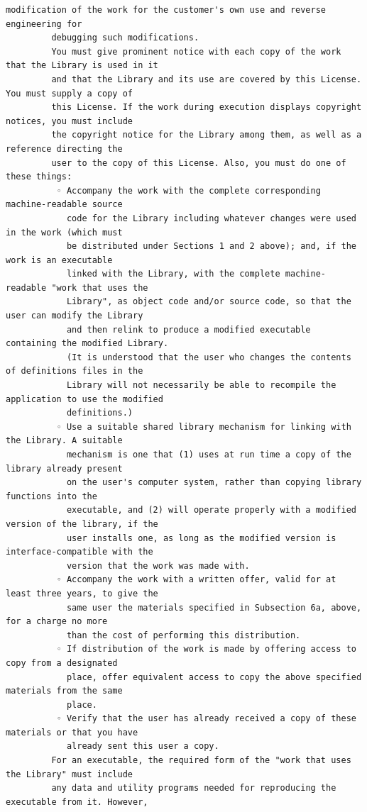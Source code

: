\begin{lstlisting}[basicstyle=\ttfamily\footnotesize,breaklines=true]
         modification of the work for the customer's own use and reverse engineering for
         debugging such modifications.
         You must give prominent notice with each copy of the work that the Library is used in it
         and that the Library and its use are covered by this License. You must supply a copy of
         this License. If the work during execution displays copyright notices, you must include
         the copyright notice for the Library among them, as well as a reference directing the
         user to the copy of this License. Also, you must do one of these things:
          ◦ Accompany the work with the complete corresponding machine-readable source
            code for the Library including whatever changes were used in the work (which must
            be distributed under Sections 1 and 2 above); and, if the work is an executable
            linked with the Library, with the complete machine-readable "work that uses the
            Library", as object code and/or source code, so that the user can modify the Library
            and then relink to produce a modified executable containing the modified Library.
            (It is understood that the user who changes the contents of definitions files in the
            Library will not necessarily be able to recompile the application to use the modified
            definitions.)
          ◦ Use a suitable shared library mechanism for linking with the Library. A suitable
            mechanism is one that (1) uses at run time a copy of the library already present
            on the user's computer system, rather than copying library functions into the
            executable, and (2) will operate properly with a modified version of the library, if the
            user installs one, as long as the modified version is interface-compatible with the
            version that the work was made with.
          ◦ Accompany the work with a written offer, valid for at least three years, to give the
            same user the materials specified in Subsection 6a, above, for a charge no more
            than the cost of performing this distribution.
          ◦ If distribution of the work is made by offering access to copy from a designated
            place, offer equivalent access to copy the above specified materials from the same
            place.
          ◦ Verify that the user has already received a copy of these materials or that you have
            already sent this user a copy.
         For an executable, the required form of the "work that uses the Library" must include
         any data and utility programs needed for reproducing the executable from it. However,

\end{lstlisting}

